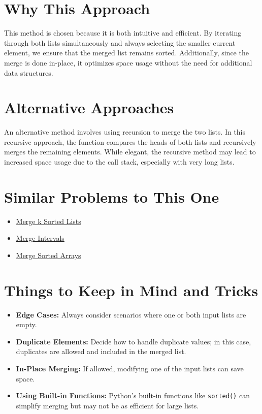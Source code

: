 \section*{Why This Approach}
This method is chosen because it is both intuitive and efficient. By iterating through both lists simultaneously and always selecting the smaller current element, we ensure that the merged list remains sorted. Additionally, since the merge is done in-place, it optimizes space usage without the need for additional data structures.

\section*{Alternative Approaches}
An alternative method involves using recursion to merge the two lists. In this recursive approach, the function compares the heads of both lists and recursively merges the remaining elements. While elegant, the recursive method may lead to increased space usage due to the call stack, especially with very long lists.

\section*{Similar Problems to This One}
\begin{itemize}
    \item \hyperref[problem:merge_k_sorted_lists]{Merge k Sorted Lists}
    \item \hyperref[problem:merge_intervals]{Merge Intervals}
    \item \hyperref[problem:sorted_arrays_merge]{Merge Sorted Arrays}
\end{itemize}

\section*{Things to Keep in Mind and Tricks}
\begin{itemize}
    \item \textbf{Edge Cases:} Always consider scenarios where one or both input lists are empty.
    \item \textbf{Duplicate Elements:} Decide how to handle duplicate values; in this case, duplicates are allowed and included in the merged list.
    \item \textbf{In-Place Merging:} If allowed, modifying one of the input lists can save space.
    \item \textbf{Using Built-in Functions:} Python’s built-in functions like \texttt{sorted()} can simplify merging but may not be as efficient for large lists.
\end{itemize}

